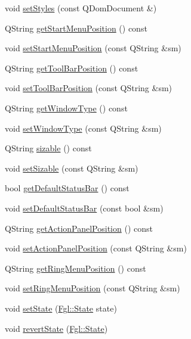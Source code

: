 \begin{DoxyCompactItemize}
\item 
void \hyperlink{classFglForm_a07c0926396e4229b40de7988689a1f16}{setStyles} (const QDomDocument \&)
\item 
QString \hyperlink{classFglForm_a40002405b99f9291e8f61944a775172a}{getStartMenuPosition} () const 
\item 
void \hyperlink{classFglForm_a2badc0486f40c57306fdefe14800a13b}{setStartMenuPosition} (const QString \&sm)
\item 
QString \hyperlink{classFglForm_ac138a537d43b85e677818e1a61f3cd3d}{getToolBarPosition} () const 
\item 
void \hyperlink{classFglForm_af3b00991b1e002fe156d0298468a2311}{setToolBarPosition} (const QString \&sm)
\item 
QString \hyperlink{classFglForm_a1e47b1b987a50ed9e4155bdf0664feba}{getWindowType} () const 
\item 
void \hyperlink{classFglForm_ad780eff8bf0437a8e33a9115885718e9}{setWindowType} (const QString \&sm)
\item 
QString \hyperlink{classFglForm_a714fbe1dca04c76d368a8a429b6322c1}{sizable} () const 
\item 
void \hyperlink{classFglForm_a805e33b8b74b0cc73dad05eac238f9db}{setSizable} (const QString \&sm)
\item 
bool \hyperlink{classFglForm_a9cacfea35fa0152d42b399fc6d2a2524}{getDefaultStatusBar} () const 
\item 
void \hyperlink{classFglForm_a4b2f8754ef3aa90fc46d04c2020ed5af}{setDefaultStatusBar} (const bool \&sm)
\item 
QString \hyperlink{classFglForm_a1d53398b0bf7a81f7d6f4fab65faa3dd}{getActionPanelPosition} () const 
\item 
void \hyperlink{classFglForm_a80b78ad88d0dc22b7f4df7a724794a13}{setActionPanelPosition} (const QString \&sm)
\item 
QString \hyperlink{classFglForm_a773cd80cab1ae1efaccc48262b2cbc55}{getRingMenuPosition} () const 
\item 
void \hyperlink{classFglForm_af25c944e246c0522cd333e452ead9cad}{setRingMenuPosition} (const QString \&sm)
\item 
void \hyperlink{classFglForm_a5f6285fdf157e863c68402ec8147c53a}{setState} (\hyperlink{namespaceFgl_a66700792cb225549384ae76c1057cf22}{Fgl::State} state)
\item 
void \hyperlink{classFglForm_a4d2edce15aac96b22d221a11c0e7681e}{revertState} (\hyperlink{namespaceFgl_a66700792cb225549384ae76c1057cf22}{Fgl::State})
\item 

\end{DoxyCompactItemize}

